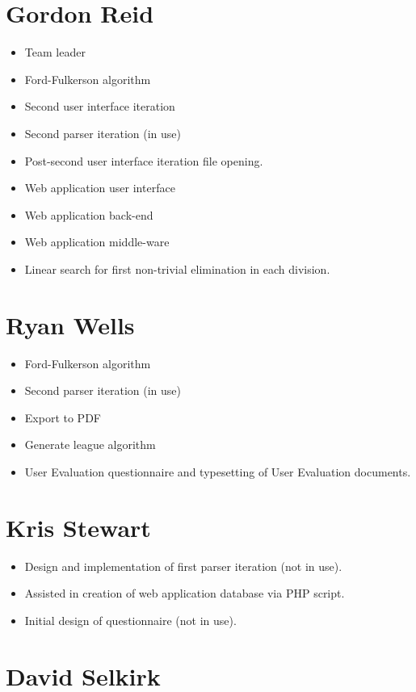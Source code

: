 \section{Gordon Reid}

\begin{itemize}
\item Team leader
\item Ford-Fulkerson algorithm
\item Second user interface iteration
\item Second parser iteration (in use)
\item Post-second user interface iteration file opening.
\item Web application user interface
\item Web application back-end
\item Web application middle-ware
\item Linear search for first non-trivial elimination in each division.
\end{itemize}

\section{Ryan Wells}

\begin{itemize}
\item Ford-Fulkerson algorithm
\item Second parser iteration (in use)
\item Export to PDF
\item Generate league algorithm
\item User Evaluation questionnaire and typesetting of User Evaluation documents.
\end{itemize}

\section{Kris Stewart}

\begin{itemize}
\item Design and implementation of first parser iteration (not in use).
\item Assisted in creation of web application database via PHP script.
\item Initial design of questionnaire (not in use).
\end{itemize}

\section{David Selkirk}

